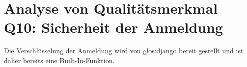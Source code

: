 
\section{Analyse von Qualitätsmerkmal Q10: Sicherheit der Anmeldung}
Die Verschlüsselung der Anmeldung wird von \gls{glos:django} bereit gestellt und ist daher
bereits eine Built-In-Funktion. 
